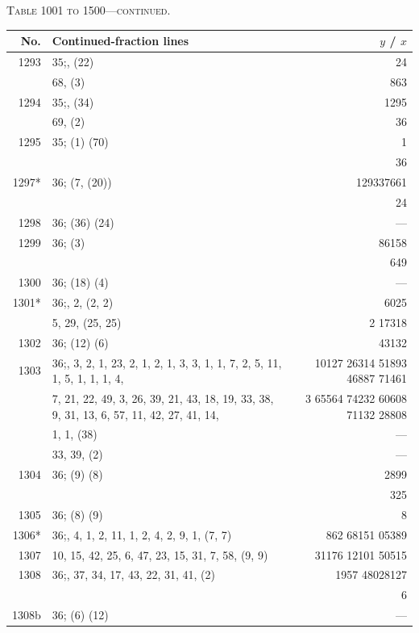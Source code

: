 \documentclass[11pt]{article}
\newcommand{\peheading}{%
  \begin{center}\small\textsc{Table 1001 to 1500---continued.}\end{center}
}
\begin{document}
\peheading
\renewcommand{\arraystretch}{1.15}
{\footnotesize
\begin{longtable}{|r|p{8.5cm}|r|}
\hline
\textbf{No.} & \textbf{Continued-fraction lines} & \textbf{$y$ \;/\; $x$}\\
\hline\endhead
1293   & $35$;\; 1, (22) & 24 \\
       & 68, (3) & 863 \\
\hline
1294   & $35$;\; 1, (34) & 1295 \\
       & 69, (2) & 36 \\
\hline
1295   & $35$;\; (1) (70) & 1 \\
       & & 36 \\
\hline
1297*  & $36$;\; (7, (20)) & 129337661 \\
       & & 24 \\
\hline
1298   & $36$;\; (36) (24) & --- \\
\hline
1299   & $36$;\; (3) & 86158 \\
       & & 649 \\
\hline
1300   & $36$;\; (18) (4) & --- \\
\hline
1301*  & $36$;\; 14, 2, (2, 2) & 6025 \\
       & 5, 29, (25, 25) & 2 17318 \\
\hline
1302   & $36$;\; (12) (6) & 43132 \\
\hline
1303   & $36$;\; 10, 3, 2, 1, 23, 2, 1, 2, 1, 3, 3, 1, 1, 7, 2, 5, 11, 1, 5, 1, 1, 1, 4, & 10127 26314 51893 46887 71461 \\
       & 7, 21, 22, 49, 3, 26, 39, 21, 43, 18, 19, 33, 38, 9, 31, 13, 6, 57, 11, 42, 27, 41, 14, & 3 65564 74232 60608 71132 28808 \\
       & 1, 1, (38) & --- \\
       & 33, 39, (2) & --- \\
\hline
1304   & $36$;\; (9) (8) & 2899 \\
       & & 325 \\
\hline
1305   & $36$;\; (8) (9) & 8 \\
\hline
1306*  & $36$;\; 7, 4, 1, 2, 11, 1, 2, 4, 2, 9, 1, (7, 7) & 862 68151 05389 \\
1307   & 10, 15, 42, 25, 6, 47, 23, 15, 31, 7, 58, (9, 9) & 31176 12101 50515 \\
\hline
1308   & $36$;\; 11, 37, 34, 17, 43, 22, 31, 41, (2) & 1957 48028127 \\
       &  & 6 \\
1308b  & $36$;\; (6) (12) & --- \\
\hline

\end{longtable}}
\end{document}
